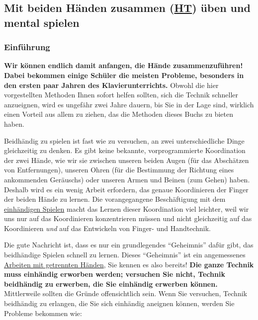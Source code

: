 
\subsection{Mit beiden Händen zusammen (\hyperref[HsHt]{HT}) üben und mental spielen}
\label{c1ii25}

\subsubsection{Einführung}
\label{c1ii25a}

\textbf{Wir können endlich damit anfangen, die Hände zusammenzuführen!
Dabei bekommen einige Schüler die meisten Probleme, besonders in den ersten paar Jahren des Klavierunterrichts.}
Obwohl die hier vorgestellten Methoden Ihnen sofort helfen sollten, sich die Technik schneller anzueignen, wird es ungefähr zwei Jahre dauern, bis Sie in der Lage sind, wirklich einen Vorteil aus allem zu ziehen, das die Methoden dieses Buchs zu bieten haben.

Beidhändig zu spielen ist fast wie zu versuchen, an zwei unterschiedliche Dinge gleichzeitig zu denken.
Es gibt keine bekannte, vorprogrammierte Koordination der zwei Hände, wie wir sie zwischen unseren beiden Augen (für das Abschätzen von Entfernungen), unseren Ohren (für die Bestimmung der Richtung eines ankommenden Geräuschs) oder unseren Armen und Beinen (zum Gehen) haben.
Deshalb wird es ein wenig Arbeit erfordern, das genaue Koordinieren der Finger der beiden Hände zu lernen.
Die vorangegangene Beschäftigung mit dem \hyperref[c1ii7]{einhändigen Spielen} macht das Lernen dieser Koordination viel leichter, weil wir uns nur auf das Koordinieren konzentrieren müssen und nicht gleichzeitig auf das Koordinieren \textit{und} auf das Entwickeln von Finger- und Handtechnik.

Die gute Nachricht ist, dass es nur ein grundlegendes \enquote{Geheimnis} dafür gibt, das beidhändige Spielen schnell zu lernen.
Dieses \enquote{Geheimnis} ist ein angemessenes \hyperref[c1ii7]{Arbeiten mit getrennten Händen}, Sie kennen es also bereits!
\textbf{Die ganze Technik muss einhändig erworben werden;
versuchen Sie nicht, Technik beidhändig zu erwerben, die Sie einhändig erwerben können.}
Mittlerweile sollten die Gründe offensichtlich sein.
Wenn Sie versuchen, Technik beidhändig zu erlangen, die Sie sich einhändig aneignen können, werden Sie Probleme bekommen wie:

